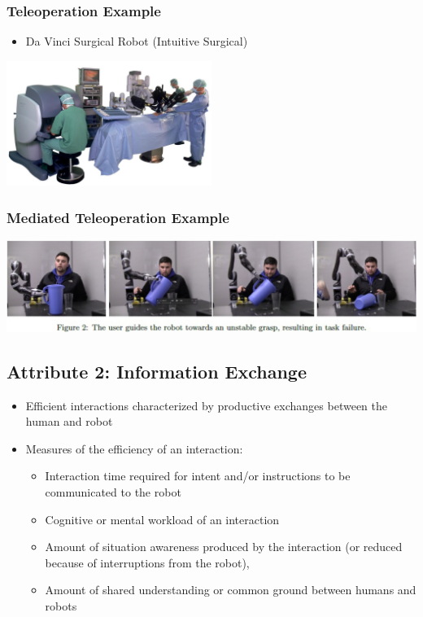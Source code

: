 \documentclass[10pt]{article}
\begin{document}
\subsubsection*{Teleoperation Example}
\begin{itemize}
	\item Da Vinci Surgical Robot (Intuitive Surgical)
\end{itemize}
\begin{center} 
	\includegraphics*[width=0.5\textwidth]{L1_1.png} 
\end{center}

\subsubsection*{Mediated Teleoperation Example}
\begin{center} 
	\includegraphics*[width=\textwidth]{L1_2.png} 
\end{center}

\subsection*{Attribute 2: Information Exchange}
\begin{itemize}
	\item Efficient interactions characterized by productive exchanges between the human and robot
	\item Measures of the efficiency of an interaction:
	\begin{itemize}
        \item Interaction time required for intent and/or instructions to be communicated to the robot
        \item Cognitive or mental workload of an interaction
        \item Amount of situation awareness produced by the interaction (or reduced because of interruptions from the robot),
        \item Amount of shared understanding or common ground between humans and robots
    \end{itemize}
\end{itemize}
\end{document}
